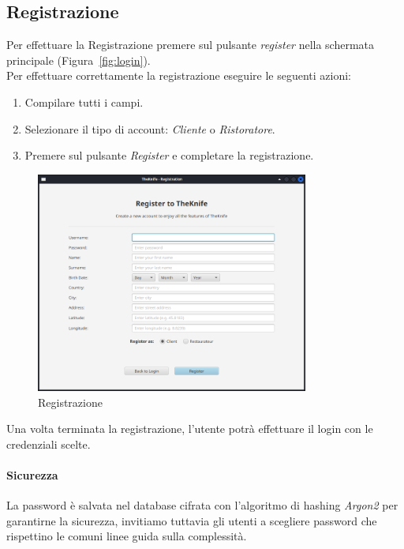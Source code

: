 \subsection{Registrazione}
Per effettuare la Registrazione premere sul pulsante 
\emph{register} nella schermata principale 
(Figura~\ref{fig:login}).\\
Per effettuare correttamente la registrazione eseguire le 
seguenti azioni:
\begin{enumerate}
    \item Compilare tutti i campi.
    \item Selezionare il tipo di account: \emph{Cliente} o \emph{Ristoratore}.
    \item Premere sul pulsante \emph{Register} e completare la registrazione.
\end{enumerate}
\begin{figure}[H]
    \centering
    \includegraphics[width=0.8\textwidth]{images/registration.png}
    \caption{Registrazione}
    \label{fig:registration}
\end{figure}
Una volta terminata la registrazione, l'utente potrà effettuare il login con le credenziali scelte.
\paragraph{Sicurezza}
La password è salvata nel database cifrata con l'algoritmo di 
hashing \textit{Argon2} per garantirne la sicurezza, invitiamo 
tuttavia gli utenti a scegliere password che rispettino le 
comuni linee guida sulla complessità.

